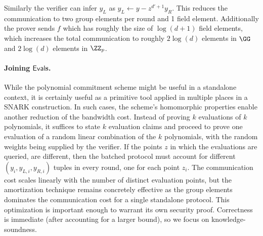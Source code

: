 \documentclass{article}
\theoremstyle{definition}
\begin{document}
Similarly the verifier can infer $y_L$ as $y_L\gets y-z^{d'+1} y_R$. This reduces the communication to two group elements per round and 1 field element. Additionally the prover sends $f$ which has roughly the size of $\log(d+1)$ field elements, which increases the total communication to roughly $2\log(d)$ elements in $\GG$ and $2\log(d)$ elements in $\ZZ_p$. 


\paragraph{Joining $\mathsf{Eval}$s.} While the polynomial commitment scheme might be useful in a standalone context, it is certainly useful as a primitive tool applied in multiple places in a SNARK construction. In such cases, the scheme's homomorphic properties enable another reduction of the bandwidth cost. Instead of proving $k$ evaluations of $k$ polynomials, it suffices to state $k$ evaluation claims and proceed to prove one evaluation of a random linear combination of the $k$ polynomials, with the random weights being supplied by the verifier. If the points $z$ in which the evaluations are queried, are different, then the batched protocol must account for different $(y_i, y_{L,i}, y_{R,i})$ tuples in every round, one for each point $z_i$. The communication cost scales linearly with the number of distinct evaluation points, but the amortization technique remains concretely effective as the group elements dominates the communication cost for a single standalone protocol. This optimization is important enough to warrant its own security proof. Correctness is immediate (after accounting for a larger bound), so we focus on knowledge-soundness.
\end{document}
